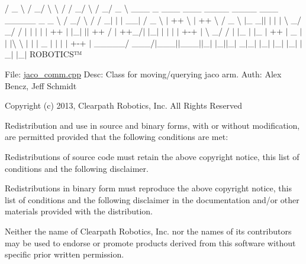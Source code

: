  / \+\_\+ \textbackslash{} / \+\_\+/ \textbackslash{} \textbackslash{} / / \+\_\+/ \textbackslash{} / \+\_\+/ \+\_\+ \textbackslash{} \+\_\+\+\_\+\+\_\+ \+\_\+ \+\_\+\+\_\+\+\_\+ \+\_\+\+\_\+\+\_\+ \+\_\+\+\_\+\+\_\+\+\_\+ \+\_\+\+\_\+\+\_\+\+\_\+ \+\_\+\+\_\+\+\_\+ \+\_\+\+\_\+\+\_\+\+\_\+\+\_\+ \+\_\+ \+\_\+ \textbackslash{} / \+\_\+/ \textbackslash{} / / \+\_\+$|$ $\vert$ $\vert$ \+\_\+\+\_\+$\vert$ / \+\_\+ \textbackslash{} $\vert$ ++ \textbackslash{} $\vert$ ++ \textbackslash{} / \+\_\+ \textbackslash{} $\vert$\+\_\+ \+\_\+$\vert$$\vert$ $\vert$ $\vert$ $\vert$ \textbackslash{} \+\_\+/ \+\_\+/ / $\vert$ $\vert$ $\vert$ $\vert$ $\vert$ ++ $\vert$ $\vert$\+\_\+$\vert$ $\vert$$\vert$ ++ / $\vert$ ++\+\_\+/$\vert$ $\vert$\+\_\+$\vert$ $\vert$ $\vert$ $\vert$ $\vert$ +-\/+ $\vert$ \textbackslash{} \+\_\+/ / $\vert$ $\vert$\+\_\+ $\vert$ $\vert$\+\_\+ $\vert$ ++ $\vert$ \+\_\+ $\vert$$\vert$ $\vert$\textbackslash{} \textbackslash{} $\vert$ $\vert$ $\vert$ \+\_\+ $\vert$ $\vert$ $\vert$ $\vert$ +-\/+ $\vert$ \+\_\+\+\_\+\+\_\+\+\_\+\+\_\+/ \+\_\+\+\_\+\+\_\+/$\vert$\+\_\+\+\_\+\+\_\+$\vert$$\vert$\+\_\+\+\_\+\+\_\+$\vert$$\vert$\+\_\+$\vert$ $\vert$\+\_\+$\vert$$\vert$\+\_\+$\vert$ \+\_\+$|$\+\_\+$\vert$ $\vert$\+\_\+$\vert$ $\vert$\+\_\+$\vert$ $\vert$\+\_\+$\vert$ $\vert$\+\_\+$\vert$ $\vert$\+\_\+$\vert$ R\+O\+B\+O\+T\+I\+C\+S™

File\+: \hyperlink{jaco__comm_8cpp}{jaco\+\_\+comm.\+cpp} Desc\+: Class for moving/querying jaco arm. Auth\+: Alex Bencz, Jeff Schmidt

Copyright (c) 2013, Clearpath Robotics, Inc. All Rights Reserved

Redistribution and use in source and binary forms, with or without modification, are permitted provided that the following conditions are met\+:
\begin{DoxyItemize}
\item Redistributions of source code must retain the above copyright notice, this list of conditions and the following disclaimer.
\item Redistributions in binary form must reproduce the above copyright notice, this list of conditions and the following disclaimer in the documentation and/or other materials provided with the distribution.
\item Neither the name of Clearpath Robotics, Inc. nor the names of its contributors may be used to endorse or promote products derived from this software without specific prior written permission.
\end{DoxyItemize}

